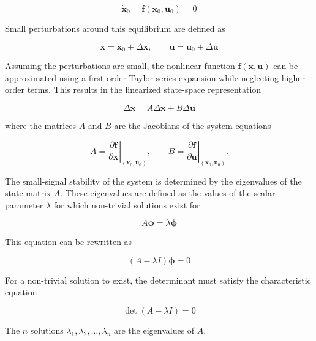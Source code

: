 \begin{equation}
\dot{\mathbf{x}}_0 = \mathbf{f}(\mathbf{x}_0,\mathbf{u}_0) = 0
\end{equation}

Small perturbations around this equilibrium are defined as

\begin{equation}
\mathbf{x} = \mathbf{x}_0 + \Delta \mathbf{x}, \qquad
\mathbf{u} = \mathbf{u}_0 + \Delta \mathbf{u}
\end{equation}

Assuming the perturbations are small, the nonlinear function $\mathbf{f}(\mathbf{x},\mathbf{u})$ can be approximated using a first-order Taylor series expansion while neglecting higher-order terms. This results in the linearized state-space representation

\begin{equation}
\Delta \dot{\mathbf{x}} = A \Delta \mathbf{x} + B \Delta \mathbf{u}
\end{equation}

where the matrices $A$ and $B$ are the Jacobians of the system equations

\begin{equation}
A = \left. \frac{\partial \mathbf{f}}{\partial \mathbf{x}} \right|_{(\mathbf{x}_0,\mathbf{u}_0)},
\qquad
B = \left. \frac{\partial \mathbf{f}}{\partial \mathbf{u}} \right|_{(\mathbf{x}_0,\mathbf{u}_0)}.
\end{equation}

The small-signal stability of the system is determined by the eigenvalues of the state matrix $A$. These eigenvalues are defined as the values of the scalar parameter $\lambda$ for which non-trivial solutions exist for

\begin{equation}
A\boldsymbol{\phi} = \lambda \boldsymbol{\phi}
\end{equation}

This equation can be rewritten as

\begin{equation}
(A-\lambda I)\boldsymbol{\phi} = 0
\end{equation}

For a non-trivial solution to exist, the determinant must satisfy the characteristic equation

\begin{equation}
\det(A-\lambda I) = 0
\end{equation}

The $n$ solutions $\lambda_1,\lambda_2,\ldots,\lambda_n$ are the eigenvalues of $A$.

